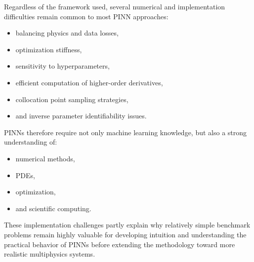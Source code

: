 Regardless of the framework used, several numerical and implementation difficulties remain common to most PINN approaches:
\begin{itemize}
    \item balancing physics and data losses,
    \item optimization stiffness,
    \item sensitivity to hyperparameters,
    \item efficient computation of higher-order derivatives,
    \item collocation point sampling strategies,
    \item and inverse parameter identifiability issues.
\end{itemize}

PINNs therefore require not only machine learning knowledge, but also a strong understanding of:
\begin{itemize}
    \item numerical methods,
    \item PDEs,
    \item optimization,
    \item and scientific computing.
\end{itemize}

These implementation challenges partly explain why relatively simple benchmark problems remain highly valuable for developing intuition and understanding the practical behavior of PINNs before extending the methodology toward more realistic multiphysics systems.